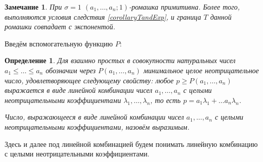 \documentclass[12pt]{article}
\newtheorem{definition}[theorem]{Определение}
\newtheorem{remark}[theorem]{Замечание}
\begin{document}
\begin{remark}
\label{rmrk:expAndT}
При $\sigma = 1$ $(a_1, \dots, a_n; 1)$-ромашка примитивна. Более того, выполняются условия следствия \ref{corollaryTandExp}, и граница $T$ данной ромашки совпадает с экспонентой.
\end{remark}

Введём вспомогательную функцию $P$:
\begin{definition}
Для взаимно простых в совокупности натуральных чисел $a_1 \le \dots \le a_n$ обозначим через $P(a_1, \dots, a_n)$ минимальное целое неотрицательное число, удовлетворяющее следующему свойству: любое $p \ge P(a_1, \dots, a_n)$ выражается в виде линейной комбинации чисел $a_1, \dots, a_n$ с целыми неотрицательными коэффициентами $\lambda_1, \dots, \lambda_n$, то есть $p = a_1 \lambda_1 + \dots a_n \lambda_n$.

Число, выражающееся в виде линейной комбинации чисел $a_1, \dots, a_n$ с целыми \\ неотрицательными коэффициентами, назовём выразимым.
\end{definition}

Здесь и далее под линейной комбинацией будем понимать линейную комбинацию с целыми неотрицательными коэффициентами.
\end{document}
